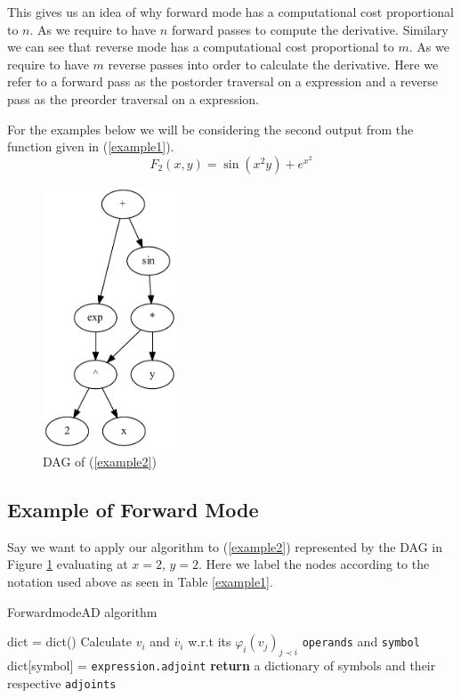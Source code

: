 \documentclass{article}
\begin{document}
This gives us an idea of why forward mode has a computational cost proportional to $n$. As we require to have $n$ forward passes to compute the derivative. Similary we can see that reverse mode has a computational cost proportional to $m$. As we require to have $m$ reverse passes into order to calculate the derivative. Here we refer to a forward pass as the postorder traversal on a expression and a reverse pass as the preorder traversal on a expression.

For the examples below we will be considering the second output from the function given in (\ref{example1}).
\begin{equation}
    \label{example2}
    F_2(x,y) = \sin(x^2y) + e^{x^2}
\end{equation}


\begin{figure}[h!]
    \includegraphics[width=4cm]{images/Graph_Example2.pdf}
    \caption{DAG of (\ref{example2})}
    \label{fig:DAGgraph}
\end{figure}

\subsection{Example of Forward Mode}

Say we want to apply our algorithm to (\ref{example2}) represented by the DAG in Figure \ref{fig:DAGgraph} evaluating at $x=2$, $y=2$. Here we label the nodes according to the notation used above as seen in Table \ref{example1}. 



\begin{algorithm}[h]
\caption{ForwardmodeAD algorithm}\label{forwardAD}
\begin{algorithmic}[1]
\State dict = dict()\Comment{}
    \State Calculate $v_i$ and $\Dot{v_i}$ w.r.t its $\varphi_i(v_j)_{j \prec i}$ \verb|operands| and \verb|symbol|
    \State dict[symbol] = \verb|expression.adjoint|
    \EndFor
\EndFor
\State \textbf{return} a dictionary of symbols and their respective \verb|adjoints|
\EndProcedure
\end{algorithmic}
\end{algorithm}
\end{document}
